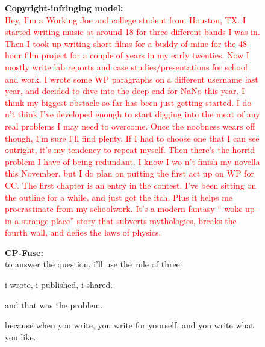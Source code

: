 \begin{figure}[!htbp]
    \begin{mdframed}[
        backgroundcolor=lightgray,
        linewidth=2pt,
        linecolor=lightblue,
        frametitle={\textbf{Title:} SatChat : What is the biggest obstacle you 've overcome in your writing ?},
        frametitlebackgroundcolor=lightblue!20,
        roundcorner=10pt,
        innerleftmargin=10pt,
        innerrightmargin=10pt,
        innertopmargin=10pt,
        innerbottommargin=10pt
    ]
    \raggedright
    \begin{minipage}[t]{\textwidth}
        \textbf{Copyright-infringing model:} \\
\textcolor{red}{Hey, I'm a Working Joe and college student from Houston, TX. I started writing music at around 18 for three different bands I was in. Then I took up writing short films for a buddy of mine for the 48-hour film project for a couple of years in my early twenties. Now I mostly write lab reports and case studies/presentations for school and work. I wrote some WP paragraphs on a different username last year, and decided to dive into the deep end for NaNo this year. 
 I think my biggest obstacle so far has been just getting started. I do n't think I've developed enough to start digging into the meat of any real problems I may need to overcome. Once the noobness wears off though, I'm sure I'll find plenty. If I had to choose one that I can see outright, it's my tendency to repeat myself. Then there's the horrid problem I have of being redundant. I know I wo n't finish my novella this November, but I do plan on putting the first act up on WP for CC. The first chapter is an entry in the contest. I've been sitting on the outline for a while, and just got the itch. Plus it helps me procrastinate from my schoolwork. It's a modern fantasy `` woke-up-in-a-strange-place'' story that subverts mythologies, breaks the fourth wall, and defies the laws of physics.}\\
    \end{minipage}
    \vspace{10pt}
    \begin{minipage}[t]{\textwidth}
        \textbf{CP-Fuse:} \\
to answer the question, i'll use the rule of three: 
 
 i wrote, i published, i shared. 
 
 and that was the problem. 
 
 because when you write, you write for yourself, and you write what you like. 
 

\end{minipage}
\end{mdframed}
\end{figure}
